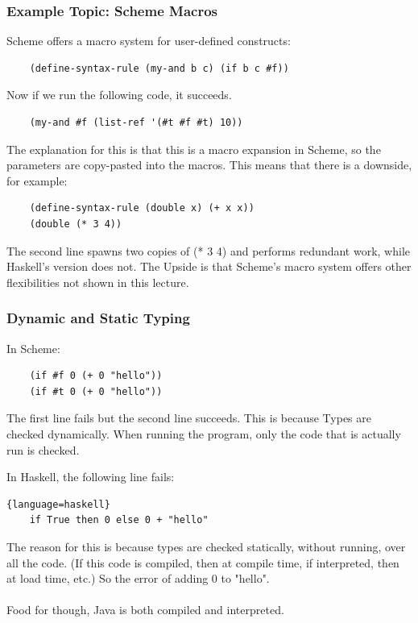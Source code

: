 \documentclass[12pt]{article}
\begin{document}
\subsubsection{Example Topic: Scheme Macros}

Scheme offers a macro system for user-defined constructs:

\begin{lstlisting}
    (define-syntax-rule (my-and b c) (if b c #f))
\end{lstlisting}

Now if we run the following code, it succeeds.

\begin{lstlisting}
    (my-and #f (list-ref '(#t #f #t) 10))
\end{lstlisting}

The explanation for this is that this is a macro expansion in Scheme, so the parameters are copy-pasted into the macros. This means that there is a downside, for example:

\begin{lstlisting}
    (define-syntax-rule (double x) (+ x x))
    (double (* 3 4))
\end{lstlisting}

The second line spawns two copies of (* 3 4) and performs redundant work, while Haskell's version does not. The Upside is that Scheme's macro system offers other flexibilities not shown in this lecture.

\subsubsection{Dynamic and Static Typing}

In Scheme:
\begin{lstlisting}
    (if #f 0 (+ 0 "hello"))
    (if #t 0 (+ 0 "hello"))
\end{lstlisting}

The first line fails but the second line succeeds. This is because Types are checked dynamically. When running the program, only the code that is actually run is checked.

In Haskell, the following line fails:
\begin{lstlisting}{language=haskell}
    if True then 0 else 0 + "hello"
\end{lstlisting}

The reason for this is because types are checked statically, without running, over all the code. (If this code is compiled, then at compile time, if interpreted, then at load time, etc.) So the error of adding 0 to "hello".\\
\\
Food for though, Java is both compiled and interpreted.
\end{document}
